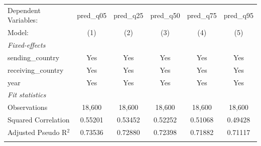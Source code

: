 
\begingroup
\centering
\begin{tabular}{lccccc}
   \tabularnewline \midrule \midrule
   Dependent Variables:  & pred\_q05  & pred\_q25  & pred\_q50  & pred\_q75  & pred\_q95\\   
   Model:                & (1)        & (2)        & (3)        & (4)        & (5)\\  
   \midrule
   \emph{Fixed-effects}\\
   sending\_country      & Yes        & Yes        & Yes        & Yes        & Yes\\  
   receiving\_country    & Yes        & Yes        & Yes        & Yes        & Yes\\  
   year                  & Yes        & Yes        & Yes        & Yes        & Yes\\  
   \midrule
   \emph{Fit statistics}\\
   Observations          & 18,600     & 18,600     & 18,600     & 18,600     & 18,600\\  
   Squared Correlation   & 0.55201    & 0.53452    & 0.52252    & 0.51068    & 0.49428\\  
   Adjusted Pseudo R$^2$ & 0.73536    & 0.72880    & 0.72398    & 0.71882    & 0.71117\\  
   \midrule \midrule
    \\
\end{tabular}
\par\endgroup


